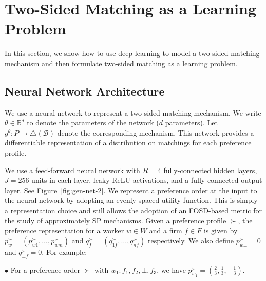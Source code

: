 \documentclass[11pt,letterpaper]{article}
\theoremstyle{definition}
\newcommand{\kibitz}[2]{\ifnum\Comments=1{\color{#1}{#2}}\fi}
\newcommand{\zf}[1]{\kibitz{blue}{[ZF: #1]}}
\newcommand{\dcp}[1]{\kibitz{orange}{[DCP: #1]}}
\newcommand{\dcpadd}[1]{{#1}}
\begin{document}
\section{Two-Sided Matching as a Learning Problem}\label{sec:learning}

In this section, we show how to use deep learning to model a two-sided matching mechanism and then formulate two-sided matching as a learning problem. %

\subsection{Neural Network Architecture}\label{sec:matching-methodology}

We use a neural network to represent a two-sided matching  mechanism.  We write $\theta\in \mathbb{R}^d$ to denote the parameters of the network ($d$ parameters). Let $g^\theta: P\to \triangle({\mathcal B})$ denote the corresponding  mechanism.
%
%
This network provides a differentiable representation of a distribution on matchings for each preference profile.

We use  a feed-forward neural network with $R = 4$ fully-connected hidden layers,   $J = 256$ units in each layer,  leaky ReLU activations, and a fully-connected output layer. 
See Figure~\ref{fig:gen-net-2}.
We represent a preference order at the input to the neural network by adopting an evenly spaced utility function.  \dcpadd{This is simply a representation choice and still allows the adoption of an FOSD-based metric for the study of approximately SP mechanisms.}
%
Given a preference  profile $\succ$, the preference representation for a worker $w\in W$ and a firm $f\in F$ is given by $p^\succ_w = (p_{w1}^\succ, \ldots, p_{wm}^\succ)$ and $q^\succ_f= (q_{1f}^\succ, \ldots, q_{nf}^\succ)$ respectively.  We also 
define $p^{\succ}_{w\bot} = 0$ and $q^\succ_{\bot f}=0$. For example:
%

$\bullet$ For a preference order $\succ$ with $w_1: f_1, f_2, \bot, f_3$, we have $p^\succ_{w_1}=(\frac{2}{3},\frac{1}{3},-\frac{1}{3})$. 
 
\end{document}
